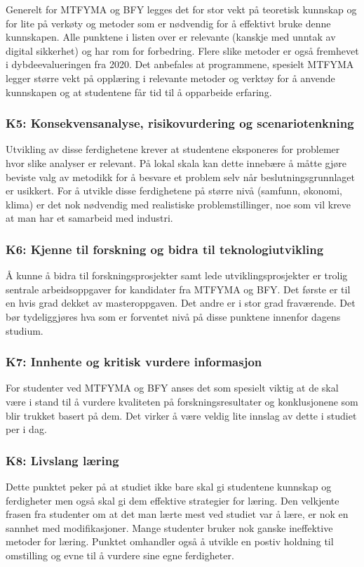 Generelt for MTFYMA og BFY legges det for stor vekt på teoretisk kunnskap og for lite på verkøty og metoder som er nødvendig for å effektivt bruke denne kunnskapen. Alle punktene i listen over er relevante (kanskje med unntak av digital sikkerhet) og har rom for forbedring. Flere slike metoder er også fremhevet i dybdeevalueringen fra 2020. Det anbefales at programmene, spesielt MTFYMA legger større vekt på opplæring i relevante metoder og verktøy for å anvende kunnskapen og at studentene får tid til å opparbeide erfaring.

\subsubsection{K5: Konsekvensanalyse, risikovurdering og scenariotenkning}
Utvikling av disse ferdighetene krever at studentene eksponeres for problemer hvor slike analyser er relevant. På lokal skala kan dette innebære å måtte gjøre beviste valg av metodikk for å besvare et problem selv når beslutningsgrunnlaget er usikkert. For å utvikle disse ferdighetene på større nivå (samfunn, økonomi, klima) er det nok nødvendig med realistiske problemstillinger, noe som vil kreve at man har et samarbeid med industri.

\subsubsection{K6: Kjenne til forskning og bidra til teknologiutvikling}
Å kunne å bidra til forskningsprosjekter samt lede utviklingsprosjekter er trolig sentrale arbeidsoppgaver for kandidater fra MTFYMA og BFY. Det første er til en hvis grad dekket av masteroppgaven. Det andre er i stor grad fraværende. Det bør tydeliggjøres hva som er forventet nivå på disse punktene innenfor dagens studium.

\subsubsection{K7: Innhente og kritisk vurdere informasjon}
For studenter ved MTFYMA og BFY anses det som spesielt viktig at de skal være i stand til å vurdere kvaliteten på forskningsresultater og konklusjonene som blir trukket basert på dem. Det virker å være veldig lite innslag av dette i studiet per i dag.

\subsubsection{K8: Livslang læring}
Dette punktet peker på at studiet ikke bare skal gi studentene kunnskap og ferdigheter men også skal gi dem effektive strategier for læring. Den velkjente frasen fra studenter om at det man lærte mest ved studiet var å lære, er nok en sannhet med modifikasjoner. Mange studenter bruker nok ganske ineffektive metoder for læring. Punktet omhandler også å utvikle en postiv holdning til omstilling og evne til å vurdere sine egne ferdigheter.

